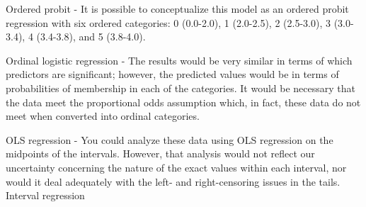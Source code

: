 Ordered probit - It is possible to conceptualize this model as an ordered probit regression with six ordered categories: 0 (0.0-2.0), 1 (2.0-2.5), 2 (2.5-3.0), 3 (3.0-3.4), 4 (3.4-3.8), and 5 (3.8-4.0).

Ordinal logistic regression - The results would be very similar in terms of which predictors are significant; however, the predicted values would be in terms of probabilities of membership in each of the categories. It would be necessary that the data meet the proportional odds assumption which, in fact, these data do not meet when converted into ordinal categories.

OLS regression - You could analyze these data using OLS regression on the midpoints of the intervals. However, that analysis would not reflect our uncertainty concerning the nature of the exact values within each interval, nor would it deal adequately with the left- and right-censoring issues in the tails.
Interval regression


